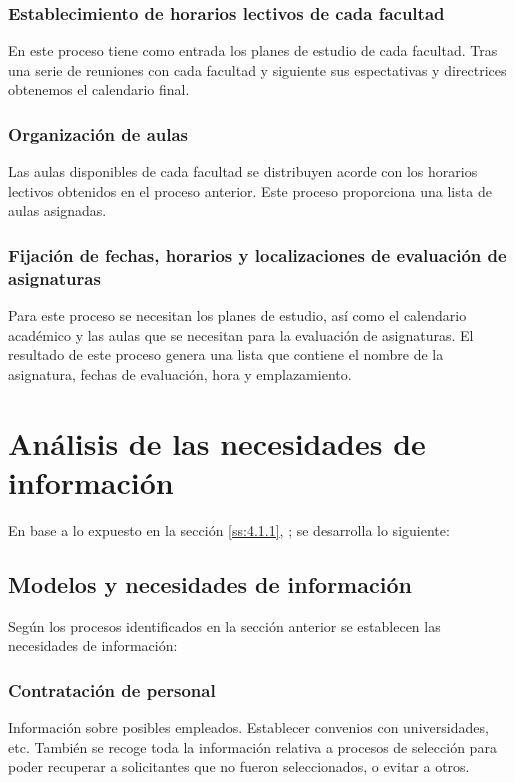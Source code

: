 \documentclass[11pt,a4paper,spanish,twoside]{report}
\begin{document}
\subsubsection{Establecimiento de horarios lectivos de cada facultad}
En este proceso tiene como entrada los planes de estudio de cada
facultad. Tras una serie de reuniones con cada facultad y siguiente sus
espectativas y directrices obtenemos el calendario final.

\subsubsection{Organización de aulas}
Las aulas disponibles de cada facultad se distribuyen acorde con los horarios
lectivos obtenidos en el proceso anterior. Este proceso proporciona una
lista de aulas asignadas. 

\subsubsection{Fijación de fechas, horarios y localizaciones de evaluación de
  asignaturas}
Para este proceso se necesitan los planes de estudio, así como el calendario
académico y las aulas que se necesitan para la evaluación de asignaturas. El
resultado de este proceso genera una lista que contiene el nombre de la
asignatura, fechas de evaluación, hora y emplazamiento. 

\section{Análisis de las necesidades de información} 
En base a lo expuesto 
en la sección \vref{ss:4.1.1}, \emph{}; 
se desarrolla lo siguiente:

\subsection{Modelos y necesidades de información} \label{ss:4.2.1}
Según los procesos identificados en la sección anterior se establecen las
necesidades de información: 

\subsubsection{Contratación de personal}
Información sobre posibles empleados. Establecer convenios con universidades,
etc. También se recoge toda la información relativa a procesos de
selección para poder recuperar a solicitantes que no fueron seleccionados, o
evitar a otros.  
\end{document}
